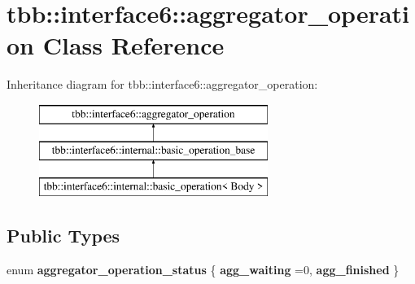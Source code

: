 \hypertarget{classtbb_1_1interface6_1_1aggregator__operation}{}\section{tbb\+:\+:interface6\+:\+:aggregator\+\_\+operation Class Reference}
\label{classtbb_1_1interface6_1_1aggregator__operation}
Inheritance diagram for tbb\+:\+:interface6\+:\+:aggregator\+\_\+operation\+:\begin{figure}[H]
\begin{center}
\leavevmode
\includegraphics[height=3.000000cm]{classtbb_1_1interface6_1_1aggregator__operation}
\end{center}
\end{figure}
\subsection*{Public Types}
\begin{DoxyCompactItemize}
\item 
\hypertarget{classtbb_1_1interface6_1_1aggregator__operation_a855dc55cb1823ed4845f4ed6b0a87700}{}enum {\bfseries aggregator\+\_\+operation\+\_\+status} \{ {\bfseries agg\+\_\+waiting} =0, 
{\bfseries agg\+\_\+finished}
 \}\label{classtbb_1_1interface6_1_1aggregator__operation_a855dc55cb1823ed4845f4ed6b0a87700}

\end{DoxyCompactItemize}
